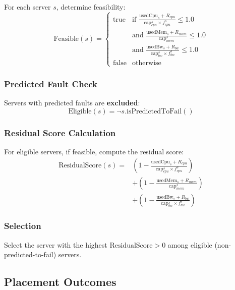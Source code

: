 \documentclass[12pt,a4paper]{article}
\begin{document}
For each server $s$, determine feasibility:
\begin{equation}
    \text{Feasible}(s) = \begin{cases}
        \text{true} & \text{if } \frac{\text{usedCpu}_s + R_{cpu}}{\text{cap}_{cpu}^s \times f_{cpu}^s} \leq 1.0 \\
        & \text{and } \frac{\text{usedMem}_s + R_{mem}}{\text{cap}_{mem}^s} \leq 1.0 \\
        & \text{and } \frac{\text{usedBw}_s + R_{bw}}{\text{cap}_{bw}^s \times f_{bw}^s} \leq 1.0 \\
        \text{false} & \text{otherwise}
    \end{cases}
\end{equation}

\subsubsection{Predicted Fault Check}

Servers with predicted faults are \textbf{excluded}:
\begin{equation}
    \text{Eligible}(s) = \neg s.\text{isPredictedToFail}()
\end{equation}

\subsubsection{Residual Score Calculation}

For eligible servers, if feasible, compute the residual score:
\begin{align}
    \text{ResidualScore}(s) = & \left(1 - \frac{\text{usedCpu}_s + R_{cpu}}{\text{cap}_{cpu}^s \times f_{cpu}^s}\right) \nonumber \\
    & + \left(1 - \frac{\text{usedMem}_s + R_{mem}}{\text{cap}_{mem}^s}\right) \nonumber \\
    & + \left(1 - \frac{\text{usedBw}_s + R_{bw}}{\text{cap}_{bw}^s \times f_{bw}^s}\right)
\end{align}

\subsubsection{Selection}

Select the server with the highest $\text{ResidualScore} > 0$ among eligible (non-predicted-to-fail) servers.

\subsection{Placement Outcomes}
\end{document}
